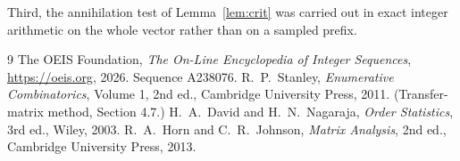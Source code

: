 \documentclass[11pt,a4paper]{article}
\theoremstyle{plain}
\theoremstyle{definition}
\begin{document}
Third, the annihilation test of Lemma~\ref{lem:crit} was carried out in exact integer
arithmetic on the whole vector rather than on a sampled prefix.

\begin{thebibliography}{9}
 The OEIS Foundation, \emph{The On-Line Encyclopedia of Integer
Sequences}, \url{https://oeis.org}, 2026. Sequence A238076.
 R.~P.~Stanley, \emph{Enumerative Combinatorics}, Volume 1, 2nd ed.,
Cambridge University Press, 2011. (Transfer-matrix method, Section 4.7.)
 H.~A.~David and H.~N.~Nagaraja, \emph{Order Statistics}, 3rd ed., Wiley,
2003.
 R.~A.~Horn and C.~R.~Johnson, \emph{Matrix Analysis}, 2nd ed., Cambridge
University Press, 2013.
\end{thebibliography}
\end{document}
